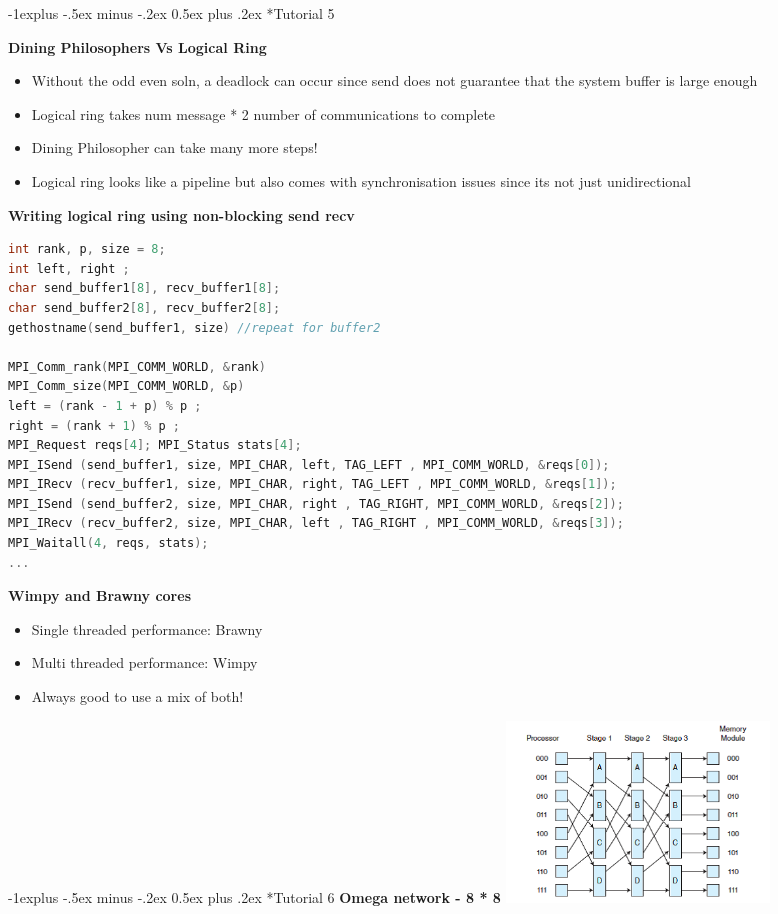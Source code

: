 \documentclass[10pt, landscape]{article}
\makeatletter
\renewcommand{\subsection}{\@startsection{subsection}{2}{0mm}%
                                {-1explus -.5ex minus -.2ex}%
                                {0.5ex plus .2ex}%
                                {\normalfont\normalsize\bfseries}}
\makeatother
\begin{document}
\begin{multicols}{4}
\subsection*{Tutorial 5}

\textbf{Dining Philosophers Vs Logical Ring}
\begin{itemize}
    \item Without the odd even soln, a deadlock can occur since send does not guarantee that the system buffer is large enough
    \item Logical ring takes num message * 2 number of communications to complete 
    \item Dining Philosopher can take many more steps! 
    \item Logical ring looks like a pipeline but also comes with synchronisation issues since its not just unidirectional
\end{itemize} 

\textbf{Writing logical ring using non-blocking send recv}
\begin{lstlisting}[language=C++, breaklines=true, breakatwhitespace=true]
int rank, p, size = 8;
int left, right ;
char send_buffer1[8], recv_buffer1[8];
char send_buffer2[8], recv_buffer2[8];
gethostname(send_buffer1, size) //repeat for buffer2

MPI_Comm_rank(MPI_COMM_WORLD, &rank)
MPI_Comm_size(MPI_COMM_WORLD, &p)
left = (rank - 1 + p) % p ;
right = (rank + 1) % p ;
MPI_Request reqs[4]; MPI_Status stats[4];
MPI_ISend (send_buffer1, size, MPI_CHAR, left, TAG_LEFT , MPI_COMM_WORLD, &reqs[0]);
MPI_IRecv (recv_buffer1, size, MPI_CHAR, right, TAG_LEFT , MPI_COMM_WORLD, &reqs[1]);
MPI_ISend (send_buffer2, size, MPI_CHAR, right , TAG_RIGHT, MPI_COMM_WORLD, &reqs[2]);
MPI_IRecv (recv_buffer2, size, MPI_CHAR, left , TAG_RIGHT , MPI_COMM_WORLD, &reqs[3]);
MPI_Waitall(4, reqs, stats);
...
\end{lstlisting}

\textbf{Wimpy and Brawny cores}
\begin{itemize}
    \item Single threaded performance: Brawny 
    \item Multi threaded performance: Wimpy
    \item Always good to use a mix of both!
\end{itemize}


\subsection*{Tutorial 6}
\textbf{Omega network - 8 * 8}
\includegraphics*[width=7cm]{omega2.png}


\end{multicols}
\end{document}
